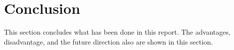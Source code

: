 \documentclass{article}
\begin{document}
\section{Conclusion}
\label{sec:conclu}
This section concludes what has been done in this report. The advantages, disadvantage, and the future direction also are shown in this section.

% 

\label{sec:refs}

\end{document}

